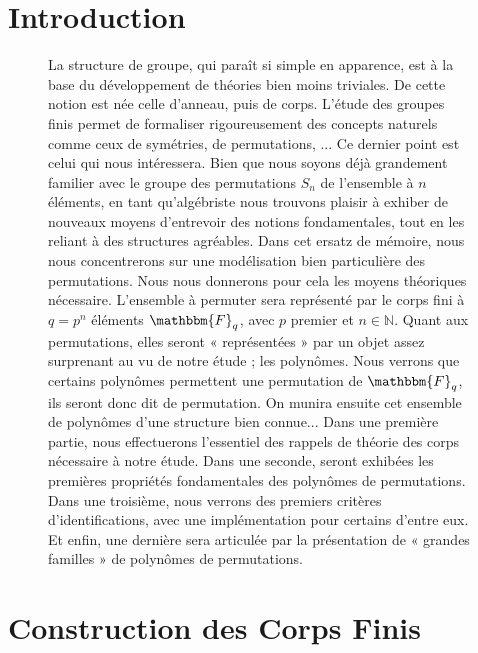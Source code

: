 \documentclass[12pt]{article}
\theoremstyle{remark}\newtheorem{note}{Note}
\theoremstyle{remark}\newtheorem{nota}{Notation}
\newcommand{\Fq}{\mathbbm{F}_q}
\theoremstyle{definition}
\begin{document}
\section*{Introduction}
\begin{figure}[h]
La structure de groupe, qui paraît si simple en apparence, est à la base du développement de théories bien moins triviales. De cette notion est née celle d’anneau, puis de corps. L’étude des groupes finis permet de formaliser rigoureusement des concepts naturels comme ceux de symétries, de permutations, ... Ce dernier point est celui qui nous intéressera. Bien que nous soyons déjà grandement familier avec le groupe des permutations $S_n$ de l’ensemble à $n$ éléments, en tant qu’algébriste nous trouvons plaisir à exhiber de nouveaux moyens d'entrevoir des notions fondamentales, tout en les reliant à des structures agréables. \newline
Dans cet ersatz de mémoire, nous nous concentrerons sur une modélisation bien particulière des permutations. \newline
Nous nous donnerons pour cela les moyens théoriques nécessaire. L’ensemble à permuter sera représenté par le corps fini à $q = p^n$ éléments $\Fq$, avec $p$ premier et $n \in \mathbb{N}$. Quant aux permutations, elles seront « représentées » par un objet assez surprenant au vu de notre étude ; les polynômes. Nous verrons que certains polynômes permettent une permutation de $\Fq$, ils seront donc dit de permutation. On munira ensuite cet ensemble de polynômes d'une structure bien connue...\newline
\break
Dans une première partie, nous effectuerons l’essentiel des rappels de théorie des corps nécessaire à notre étude. Dans une seconde, seront exhibées les premières propriétés fondamentales des polynômes de permutations. Dans une troisième, nous verrons des premiers critères d’identifications, avec une implémentation pour certains d'entre eux. Et enfin, une dernière sera articulée par la présentation de « grandes familles » de polynômes de permutations.
\end{figure}

\vfill \eject


\pagebreak 



\section{Construction des Corps Finis}
\end{document}
